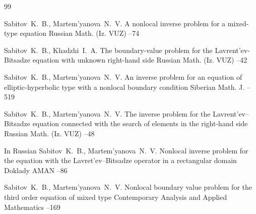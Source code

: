 \begin{thebibliography}{99}

\by Sabitov~K.~B., Martem'yanova~N.~V.
\paper A nonlocal inverse problem for a mixed-type equation
\jour Russian Math. (Iz. VUZ)
--74

\by Sabitov~K.~B., Khadzhi~I.~A.
\paper The boundary-value problem for the Lavrent’ev-Bitsadze equation with unknown right-hand side
\jour Russian Math. (Iz. VUZ)
--42

\by Sabitov~K.~B., Martem'yanova~N.~V.
\paper An inverse problem for an equation of elliptic-hyperbolic type with a nonlocal boundary condition
\jour Siberian Math. J.
--519

\by Sabitov~K.~B., Martem'yanova~N.~V.
\paper The inverse problem for the Lavrent'ev–Bitsadze equation connected with the search of elements in the right-hand side
\jour Russian Math. (Iz. VUZ)
--48

\lang In Russian
\by Sabitov~K.~B., Martem'yanova~N.~V.
\paper Nonlocal inverse problem for the equation with the Lavret'ev--Bitsadze operator in a rectangular domain
\jour Doklady AMAN
–86


\by  Sabitov~K.~B., Martem'yanova~N.~V.
 \paper Nonlocal boundary value problem for the third order equation of mixed type 
 \jour Contemporary Analysis and Applied Mathematics
 –169


\end{thebibliography}
